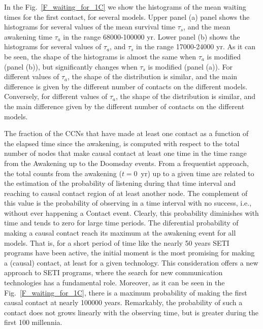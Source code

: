 \documentclass[crop]{CSLB}
\newcommand{\cetis}{CCNs}
\newcommand{\ffn}[1]{}
\begin{document}
\ffn{6}
%
In the Fig.~\ref{F_waiting_for_1C} we show the histograms of the mean
waiting times for the first contact, for several models.
%
Upper panel (a) panel shows the histograms for several values of the
mean survival time $\tau_s$, and the mean awakening time $\tau_a$ in
the range 68000-100000 yr.
%
Lower panel (b) shows the histograms for several values of $\tau_a$,
and $\tau_s$ in the range 17000-24000 yr.
%
As it can be seen, the shape of the histograms is almost the same when
$\tau_a$ is modified (panel (b)), but significantly changes when
$\tau_s$ is modified (panel (a)). 
%
For different values of $\tau_a$, the shape of the distribution is
similar, and the main difference is given by the different number of
contacts on the different models.
%
Conversely, for different values of $\tau_a$, the shape of the
distribution is similar, and the main difference given by the
different number of contacts on the different models. 
 

The fraction of the \cetis{} that have made at least one contact as a
function of the elapsed time since the awakening, is computed with
respect to the total number of nodes that make causal contact at least
one time in the time range from the Awakening up to the Doomsday
events.
%
From a frequentist approach, the total counts from the awakening
($t=$0~yr) up to a given time are related to the estimation of the
probability of listening during that time interval and reaching to
causal contact region of at least another node.
%
The complement of this value is the probability of observing in a time
interval with no success, i.e., without ever happening a Contact
event.
%
Clearly, this probability diminishes with time and tends to zero for
large time periods.
%             
The diferential probability of making a causal contact reach its
maximum at the awakening event for all models.
%
That is, for a short period of time like the nearly 50 years SETI
programs have been active, the initial moment is the most promising
for making a (causal) contact, at least for a given technology.
%
This consideration offers a new approach to SETI programs, where the
search for new communication technologies has a fundamental role.
%
Moreover, as it can be seen in the Fig.~\ref{F_waiting_for_1C}, there
is a maximum probability of making the first causal contact at nearly
100000 years.
%
Remarkably, the probability of such a contact does not grows linearly
with the observing time, but is greater during the first 100
millennia.
\end{document}
